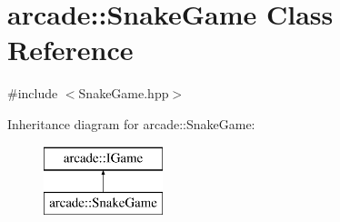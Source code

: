 \hypertarget{classarcade_1_1_snake_game}{}\section{arcade\+:\+:Snake\+Game Class Reference}
\label{classarcade_1_1_snake_game}


{\ttfamily \#include $<$Snake\+Game.\+hpp$>$}

Inheritance diagram for arcade\+:\+:Snake\+Game\+:\begin{figure}[H]
\begin{center}
\leavevmode
\includegraphics[height=2.000000cm]{classarcade_1_1_snake_game}
\end{center}
\end{figure}

